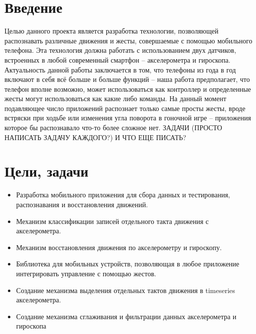 \section{Введение}

Целью данного проекта является разработка технологии, позволяющей распознавать различные движения и жесты, совершаемые с помощью мобильного телефона. Эта технология должна работать с использованием двух датчиков, встроенных в любой современный смартфон – акселерометра и гироскопа.
Актуальность данной работы заключается в том, что телефоны из года в год включают в себя всё больше и больше функций – наша работа предполагает, что телефон вполне возможно, может использоваться как контроллер и определенные жесты могут использоваться как какие либо команды.
На данный момент подавляющее число приложений распознает только самые просты жесты, вроде встряски при ходьбе или изменения угла поворота в гоночной игре – приложения которое бы распознавало что-то более сложное нет.
ЗАДАЧИ (ПРОСТО НАПИСАТЬ ЗАДАЧУ КАЖДОГО?) И ЧТО ЕЩЕ ПИСАТЬ?

\section{Цели, задачи}
\begin{itemize}
    \item Разработка мобильного приложения для сбора данных и тестирования, распознавания и восстановления движений.
    \item Механизм классификации записей отдельного такта движения с акселерометра.
    \item Механизм восстановления движения по акселерометру и гироскопу.
    \item Библиотека для мобильных устройств, позволяющая в любое приложение интегрировать управление с помощью жестов. 
    \item Создание механизма выделения отдельных тактов движения в timeseries акселерометра.
    \item Создание механизма сглаживания и фильтрации данных акселерометра и гироскопа
\end{itemize}